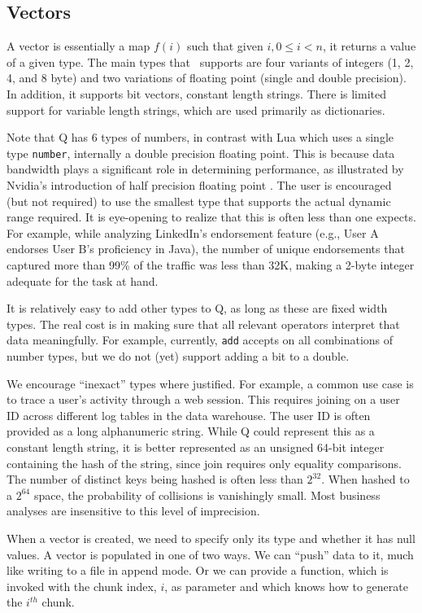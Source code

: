 \subsection{Vectors}
\label{Vectors}
A vector is essentially a map \(f(i)\) such that given \(i, 0 \leq i < n\), it
returns a value of a given type. The main types that \Q\ supports are four variants
of integers (1, 2, 4, and 8 byte) and two variations of floating point (single
and double precision). In addition, it supports bit vectors, constant length
strings. There is limited support for variable length strings, which are used
primarily as dictionaries. 

Note that Q has 6 types of numbers, in contrast with Lua which uses a 
single type {\tt number}, internally a double precision floating point.
This is because data bandwidth plays a significant role in determining
performance, as illustrated by Nvidia's
introduction of half precision floating point  \cite{nvidia2017}. The user is
encouraged (but not required) to use the smallest type that supports the actual
dynamic range required. It is eye-opening to realize that this is often  less
than one expects. For example, while analyzing LinkedIn's endorsement feature
(e.g., User A endorses User B's proficiency in Java),
the number of unique endorsements that captured more than 99\% of the traffic
was less than 32K, making a 2-byte integer adequate for the task at hand.

It is relatively easy to add other types to Q, as long as these 
are fixed width types. The real cost is in making sure that all relevant
operators interpret that data meaningfully. For example, currently, {\tt add}
accepts on all combinations of number types, but we do not (yet)
support adding a bit to a double.

We
encourage ``inexact'' types where justified. For example, a common use case is
to trace a user's activity through a web session. This requires joining on a
user ID across different log tables in the data warehouse. The user ID is
often provided as a long alphanumeric string. While Q could represent this as a
constant length string, it is better represented as an unsigned 64-bit integer
containing the hash of the string, since join requires only equality comparisons.
The number of distinct keys being hashed is often less than \(2^{32}\). When
hashed to a \(2^{64}\) space, the probability of collisions is vanishingly
small. Most business analyses are insensitive to this level of imprecision.

When a vector is created, we need to specify only its type and whether it has
null values. A vector is populated in one of two ways. We can ``push'' data to
it, much like writing to a file in append mode. Or we can provide a function,
which is invoked with the chunk index, \(i\), as parameter and which knows how to
generate the \(i^{th}\) chunk.

